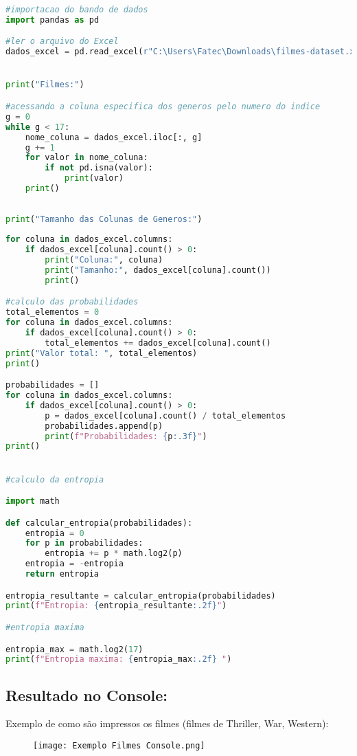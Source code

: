 \documentclass{article}
\begin{document}
\begin{lstlisting}[language=Python]
#importacao do bando de dados
import pandas as pd

#ler o arquivo do Excel
dados_excel = pd.read_excel(r"C:\Users\Fatec\Downloads\filmes-dataset.xlsx")


print("Filmes:")

#acessando a coluna especifica dos generos pelo numero do indice
g = 0
while g < 17:
    nome_coluna = dados_excel.iloc[:, g]
    g += 1
    for valor in nome_coluna:
        if not pd.isna(valor): 
            print(valor) 
    print()
    
    
print("Tamanho das Colunas de Generos:")
    
for coluna in dados_excel.columns:
    if dados_excel[coluna].count() > 0:
        print("Coluna:", coluna)
        print("Tamanho:", dados_excel[coluna].count())
        print()

#calculo das probabilidades
total_elementos = 0
for coluna in dados_excel.columns:
    if dados_excel[coluna].count() > 0: 
        total_elementos += dados_excel[coluna].count() 
print("Valor total: ", total_elementos) 
print()

probabilidades = []
for coluna in dados_excel.columns:
    if dados_excel[coluna].count() > 0:
        p = dados_excel[coluna].count() / total_elementos
        probabilidades.append(p)
        print(f"Probabilidades: {p:.3f}") 
print()


#calculo da entropia

import math

def calcular_entropia(probabilidades):
    entropia = 0
    for p in probabilidades:
        entropia += p * math.log2(p)
    entropia = -entropia
    return entropia

entropia_resultante = calcular_entropia(probabilidades)
print(f"Entropia: {entropia_resultante:.2f}")

#entropia maxima

entropia_max = math.log2(17)
print(f"Entropia maxima: {entropia_max:.2f} ")

\end{lstlisting}

\newpage

\subsection{Resultado no Console:\newline }

Exemplo de como são impressos os filmes (filmes de Thriller, War, Western):
\begin{figure}[ht]
  \centering
  \texttt{[image: Exemplo Filmes Console.png]}
  \label{fig:imagem}
\end{figure}
\end{document}
